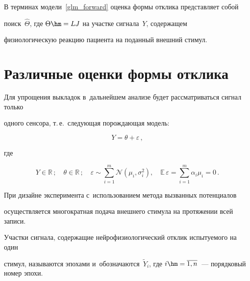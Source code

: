 В терминах модели~\eqref{glm_forward} оценка формы отклика представляет собой 


поиск~$\hat{\Theta}$, где $\Theta \hm= LJ$ на участке сигнала~$Y$, содержащем 


физиологическую реакцию пациента на поданный внешний стимул.








\section{Различные оценки формы отклика}





Для упрощения выкладок в~дальнейшем анализе будет рассматриваться сигнал только 


одного сенсора, т.\,е.\ следующая порождающая модель:


\begin{equation}


\label{simplified_model}


Y = \theta + \varepsilon\,,


\end{equation}


где 


$$


Y \in \mathbb{R}\,;\quad


\theta \in \mathbb{R}\,;\quad


\varepsilon \sim 


\sum\limits_{i=1}^m\mathcal{N}\left(\mu_i,\sigma_i^2\right),\quad


\mathbb{E}\,\varepsilon  = \sum\limits_{i=1}^m \alpha_i\mu_i = 0\,.


$$








При дизайне эксперимента с~использованием метода вызванных потенциалов 


осуществляется многократная подача внешнего стимула на протяжении всей записи. 


Участки сигнала, содержащие нейрофизиологический отклик испытуемого на один 


стимул, называются эпохами и~обозначаются~$\tilde{Y}_i$, где $i \hm= 


\overline{1,n}$~--- порядковый номер эпохи.






